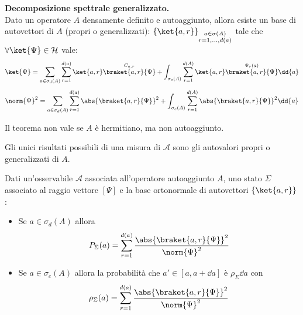 \begin{theorem}
    {\normalfont \textbf{Decomposizione spettrale generalizzato.}}\\
    Dato un operatore \(A\) densamente definito e autoaggiunto, allora esiste un base di autovettori di \(A\) (propri o generalizzati):
    \(
        \left\{ \ket{a, r} \right\}_{\substack{a \in \sigma(A)\\ r = 1,\dots,d(a)}}
    \) tale che \(\forall \ket{\Psi} \in \mathcal{H}\) vale:
    \begin{equation}
        \ket{\Psi}= \sum_{a \in \sigma_d(A)} \sum_{r=1}^{d(a)} \ket{a,r}\overset{C_{a,r}}{\braket{a,r}{\Psi}} +
        \int_{\sigma_c(A)}\sum_{r=1}^{d(A)}\ket{a,r}\overset{\Psi_r(a)}{\braket{a,r}{\Psi}}\dd{a}
    \end{equation}
    \begin{equation}
        \norm{\Psi}^2=\sum_{a \in \sigma_d(A)} \sum_{r=1}^{d(a)} \abs{\braket{a,r}{\Psi}}^2 +
        \int_{\sigma_c(A)}\sum_{r=1}^{d(A)}\abs{\braket{a,r}{\Psi}}^2\dd{a}
    \end{equation}

\end{theorem}

\begin{attention}
    Il teorema non vale se \(A\) è hermitiano, ma non autoaggiunto.
\end{attention}


\begin{postulato3}
    Gli unici risultati possibili di una misura di \(\mathcal{A}\) sono gli autovalori propri o generalizzati di \(A\).
\end{postulato3}

\begin{postulato4}
    Dati un'osservabile \(\mathcal{A}\) associata all'operatore autoaggiunto \(A\),
    uno stato \(\Sigma\) associato al raggio vettore \([\Psi]\) e la base ortonormale di autovettori \(\left\{ \ket{a,r} \right\}\):
    \begin{itemize}
        \item Se \(a \in \sigma_d(A)\) allora 
        \begin{equation}
            P_\Sigma(a)= \sum_{r=1}^{d(a)}\frac{\abs{\braket{a,r}{\Psi}}^2}{\norm{\Psi}^2}
        \end{equation}
        \item Se \(a \in \sigma_c(A)\) allora la probabilità che \(a' \in [a,a + \dd{a}]\) è \(\rho_\Sigma \dd{a}\) con 
        \begin{equation}
            \rho_\Sigma (a) = \sum_{r=1}^{d(a)}\frac{\abs{\braket{a,r}{\Psi}}^2}{\norm{\Psi}^2}
        \end{equation}
    \end{itemize}
\end{postulato4}


